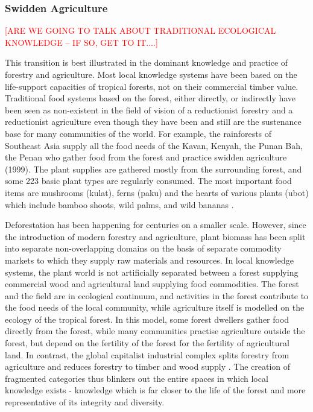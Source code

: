 \subsubsection{Swidden Agriculture}

\textcolor{red}{[ARE WE GOING TO TALK ABOUT TRADITIONAL ECOLOGICAL KNOWLEDGE -- IF SO, GET TO IT....]}

This transition is best illustrated in the dominant knowledge and practice of forestry and agriculture. Most local knowledge systems have been based on the life-support capacities of tropical forests, not on their commercial timber value. Traditional food systems based on the forest, either directly, or indirectly have been seen as non-existent in the field of vision of a reductionist forestry and a reductionist agriculture even though they have been and still are the sustenance base for many communities of the world. For example, the rainforests of Southeast Asia supply all the food needs of the Kavan, Kenyah, the Punan Bah, the Penan who gather food from the forest and practice swidden agriculture (1999). The plant supplies are gathered mostly from the surrounding forest, and some 223 basic plant types are regularly consumed. The most important food items are mushrooms (kulat), ferns (paku) and the hearts of various plants (ubot) which include bamboo shoots, wild palms, and wild bananas \citep{hong1987natives}.

Deforestation has been happening for centuries on a smaller scale. However, since the introduction of modern forestry and agriculture, plant biomass has been split into separate non-overlapping domains on the basis of separate commodity markets to which they supply raw materials and resources. In local knowledge systems, the plant world is not artificially separated between a forest supplying commercial wood and agricultural land supplying food commodities. The forest and the field are in ecological continuum, and activities in the forest contribute to the food needs of the local community, while agriculture itself is modelled on the ecology of the tropical forest. In this model, some forest dwellers gather food directly from the forest, while many communities practise agriculture outside the forest, but depend on the fertility of the forest for the fertility of agricultural land. In contrast, the global capitalist industrial complex splits forestry from agriculture and reduces forestry to timber and wood supply \citep{de1989economic}. The creation of fragmented categories thus blinkers out the entire spaces in which local knowledge exists - knowledge which is far closer to the life of the forest and more representative of its integrity and diversity.





